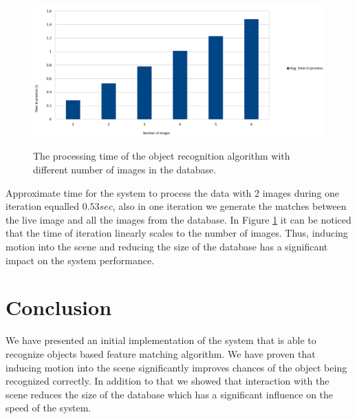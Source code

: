 \begin{figure}
\centering 

\includegraphics[width=1.2\columnwidth]{figures/thesis-time.png}\\


\caption{The processing time of the object recognition algorithm with different number of images in the database.}
\label{fig:recognition-time}
\end{figure}

Approximate time for the system to process the data with 2 images during one iteration equalled $0.53 sec$, also in one iteration we generate the matches between the live image and all the images from the database. In Figure \ref{fig:recognition-time} it can be noticed that the time of iteration linearly scales to the number of images. Thus, inducing motion into the scene and reducing the size of the database has a significant impact on the system performance.





\section{Conclusion}
We have presented an initial implementation of the system that is able to recognize objects based feature matching algorithm. We have proven that inducing motion into the scene significantly improves chances of the object being recognized correctly. In addition to that we showed that interaction with the scene reduces the size of the database which has a significant influence on the speed of the system.  
